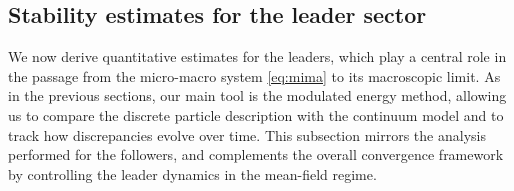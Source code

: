 \documentclass[10pt, reqno]{amsart}
\theoremstyle{definition}
\theoremstyle{remark}
\numberwithin{equation}{section}
\begin{document}
\subsection{Stability estimates for the leader sector}

We now derive quantitative estimates for the leaders, which play a central role in the passage from the micro-macro system \eqref{eq:mima} to its macroscopic limit. As in the previous sections, our main tool is the modulated energy method, allowing us to compare the discrete particle description with the continuum model and to track how discrepancies evolve over time. This subsection mirrors the analysis performed for the followers, and complements the overall convergence framework by controlling the leader dynamics in the mean-field regime.
\end{document}
